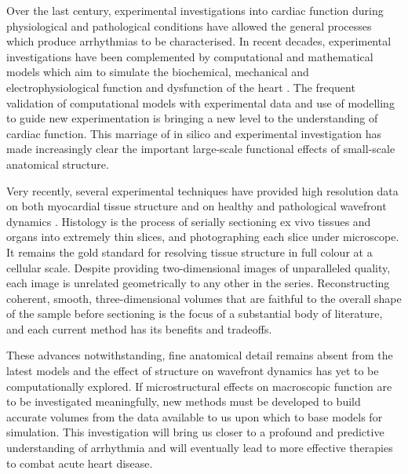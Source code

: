   Over the last century, experimental investigations into cardiac function during physiological and pathological conditions have allowed the general processes which produce arrhythmias to be characterised. In recent decades, experimental investigations have been complemented by computational and mathematical models which aim to simulate the biochemical, mechanical and electrophysiological function and dysfunction of the heart \cite{StreeterJr1969,Hooks2002,Carusi2012}. The frequent validation of computational models with experimental data and use of modelling to guide new experimentation is bringing a new level to the understanding of cardiac function. This marriage of in silico and experimental investigation has made increasingly clear the important large-scale functional effects of small-scale anatomical structure.
  
  Very recently, several experimental techniques have provided high resolution data on both myocardial tissue structure \cite{Burton2006,Rutherford2012} and on healthy and pathological wavefront dynamics \cite{Valderrabano2003}. Histology is the process of serially sectioning ex vivo tissues and organs into extremely thin slices, and photographing each slice under microscope. It remains the gold standard for resolving tissue structure in full colour at a cellular scale. Despite providing two-dimensional images of unparalleled quality, each image is unrelated geometrically to any other in the series. Reconstructing coherent, smooth, three-dimensional volumes that are faithful to the overall shape of the sample before sectioning is the focus of a substantial body of literature, and each current method has its benefits and tradeoffs. 
  
  These advances notwithstanding, fine anatomical detail remains absent from the latest models and the effect of structure on wavefront dynamics has yet to be computationally explored. If microstructural effects on macroscopic function are to be investigated meaningfully, new methods must be developed to build accurate volumes from the data available to us upon which to base models for simulation. This investigation will bring us closer to a profound and predictive understanding of arrhythmia and will eventually lead to more effective therapies to combat acute heart disease.  
  
